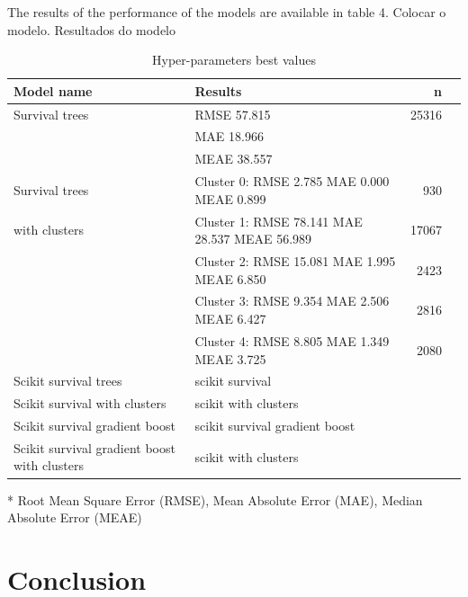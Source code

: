 \documentclass[
  12pt,
]{article}
\begin{document}
The results of the performance of the models are available in table 4. Colocar o
modelo. Resultados do modelo

\begin{table}[ht]
    \footnotesize
    \centering
    \begin{tabular}{p{}p{}r p{}}
    \hline
    \textbf{Model name} & \textbf{Results} & \textbf{n}\\
    \hline
    Survival trees  & RMSE 57.815                                     & 25316\\
                    & MAE 18.966                                      & \\   
                    & MEAE 38.557                                     & \\
    Survival trees  & Cluster 0: RMSE  2.785 MAE  0.000 MEAE  0.899   &   930\\
    with clusters   & Cluster 1: RMSE 78.141 MAE 28.537 MEAE 56.989   & 17067\\
                    & Cluster 2: RMSE 15.081 MAE  1.995 MEAE  6.850   &  2423\\
                    & Cluster 3: RMSE  9.354 MAE  2.506 MEAE  6.427   &  2816\\
                    & Cluster 4: RMSE  8.805 MAE  1.349 MEAE  3.725   &  2080\\
                    
    Scikit survival 
    trees           & scikit survival                                 & \\
    Scikit survival 
    with clusters   & scikit with clusters                            & \\
    Scikit survival 
    gradient boost  & scikit survival gradient boost                  & \\
    Scikit survival 
    gradient boost 
    with clusters   & scikit with clusters                            & \\
    \hline
    \end{tabular}
    \caption{Hyper-parameters best values}
    \label{hyperparametersbestvalues}
    * Root Mean Square Error (RMSE), Mean Absolute Error (MAE), Median Absolute Error (MEAE)  
\end{table}

\hypertarget{conclusion}{%
\section{Conclusion}\label{conclusion}}
\end{document}
